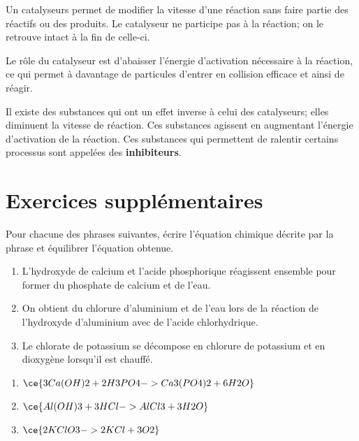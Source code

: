 \documentclass[
  11pt,
  a4paper,
  openany]{book}
\providecommand{\tightlist}{%
  \setlength{\itemsep}{0pt}\setlength{\parskip}{0pt}}
\begin{document}
Un catalyseurs permet de modifier la vitesse d'une réaction sans faire partie des réactifs ou des produits. Le catalyseur ne participe pas à la réaction; on le retrouve intact à la fin de celle-ci.

Le rôle du catalyseur est d'abaisser l'énergie d'activation nécessaire à la réaction, ce qui permet à davantage de particules d'entrer en collision efficace et ainsi de réagir.

Il existe des substances qui ont un effet inverse à celui des catalyseurs; elles diminuent la vitesse de réaction. Ces substances agissent en augmentant l'énergie d'activation de la réaction. Ces substances qui permettent de ralentir certains processus sont appelées des \textbf{inhibiteurs}.

\hypertarget{exercices-suppluxe9mentaires-8}{%
\section{Exercices supplémentaires}\label{exercices-suppluxe9mentaires-8}}

\begin{Exercise}

Pour chacune des phrases suivantes, écrire l'équation chimique décrite par la phrase et équilibrer l'équation obtenue.

\begin{enumerate}
\def\labelenumi{\arabic{enumi}.}
\tightlist
\item
  L'hydroxyde de calcium et l'acide phosphorique réagissent ensemble pour former du phosphate de calcium et de l'eau.
\item
  On obtient du chlorure d'aluminium et de l'eau lors de la réaction de l'hydroxyde d'aluminium avec de l'acide chlorhydrique.
\item
  Le chlorate de potassium se décompose en chlorure de potassium et en dioxygène lorsqu'il est chauffé.
\end{enumerate}

\end{Exercise}

\begin{Answer}

\begin{enumerate}
\def\labelenumi{\arabic{enumi}.}
\item
  \(\ce{3Ca(OH)2 + 2H3PO4 -> Ca3(PO4)2 + 6H2O}\)
\item
  \(\ce{Al(OH)3 + 3HCl -> AlCl3 + 3H2O}\)
\item
  \(\ce{2KClO3 -> 2KCl + 3O2}\)
\end{enumerate}

\end{Answer}
\end{document}
